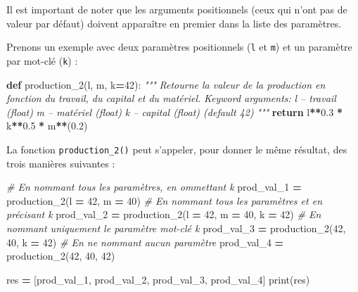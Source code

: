 \documentclass[12pt,]{book}
\newenvironment{Shaded}{\begin{snugshade}}{\end{snugshade}}
\newcommand{\KeywordTok}[1]{\textcolor[rgb]{0.13,0.29,0.53}{\textbf{#1}}}
\newcommand{\DecValTok}[1]{\textcolor[rgb]{0.00,0.00,0.81}{#1}}
\newcommand{\FloatTok}[1]{\textcolor[rgb]{0.00,0.00,0.81}{#1}}
\newcommand{\CommentTok}[1]{\textcolor[rgb]{0.56,0.35,0.01}{\textit{#1}}}
\newcommand{\ControlFlowTok}[1]{\textcolor[rgb]{0.13,0.29,0.53}{\textbf{#1}}}
\newcommand{\OperatorTok}[1]{\textcolor[rgb]{0.81,0.36,0.00}{\textbf{#1}}}
\newcommand{\BuiltInTok}[1]{#1}
\newcommand{\NormalTok}[1]{#1}
\numberwithin{equation}{section}
\numberwithin{countremarque}{section}
\begin{document}
Il est important de noter que les arguments positionnels (ceux qui n'ont
pas de valeur par défaut) doivent apparaître en premier dans la liste
des paramètres.

Prenons un exemple avec deux paramètres positionnels (\texttt{l} et
\texttt{m}) et un paramètre par mot-clé (\texttt{k}) :

\begin{Shaded}
\begin{Highlighting}[]
\KeywordTok{def}\NormalTok{ production_2(l, m, k}\OperatorTok{=}\DecValTok{42}\NormalTok{):}
  \CommentTok{"""}
\CommentTok{  Retourne la valeur de la production en fonction}
\CommentTok{  du travail, du capital et du matériel.}
\CommentTok{  }
\CommentTok{  Keyword arguments:}
\CommentTok{  l -- travail (float)}
\CommentTok{  m -- matériel (float)}
\CommentTok{  k -- capital (float) (default 42)}
\CommentTok{  """}
  \ControlFlowTok{return}\NormalTok{ l}\OperatorTok{**}\FloatTok{0.3} \OperatorTok{*}\NormalTok{ k}\OperatorTok{**}\FloatTok{0.5} \OperatorTok{*}\NormalTok{ m}\OperatorTok{**}\NormalTok{(}\FloatTok{0.2}\NormalTok{)}
\end{Highlighting}
\end{Shaded}

La fonction \texttt{production\_2()} peut s'appeler, pour donner le même
résultat, des trois manières suivantes :

\begin{Shaded}
\begin{Highlighting}[]
\CommentTok{# En nommant tous les paramètres, en ommettant k}
\NormalTok{prod_val_1 }\OperatorTok{=}\NormalTok{ production_2(l }\OperatorTok{=} \DecValTok{42}\NormalTok{, m }\OperatorTok{=} \DecValTok{40}\NormalTok{)}
\CommentTok{# En nommant tous les paramètres et en précisant k}
\NormalTok{prod_val_2 }\OperatorTok{=}\NormalTok{ production_2(l }\OperatorTok{=} \DecValTok{42}\NormalTok{, m }\OperatorTok{=} \DecValTok{40}\NormalTok{, k }\OperatorTok{=} \DecValTok{42}\NormalTok{)}
\CommentTok{# En nommant uniquement le paramètre mot-clé k}
\NormalTok{prod_val_3 }\OperatorTok{=}\NormalTok{ production_2(}\DecValTok{42}\NormalTok{, }\DecValTok{40}\NormalTok{, k }\OperatorTok{=} \DecValTok{42}\NormalTok{)}
\CommentTok{# En ne nommant aucun paramètre}
\NormalTok{prod_val_4 }\OperatorTok{=}\NormalTok{ production_2(}\DecValTok{42}\NormalTok{, }\DecValTok{40}\NormalTok{, }\DecValTok{42}\NormalTok{)}

\NormalTok{res }\OperatorTok{=}\NormalTok{ [prod_val_1, prod_val_2, prod_val_3, prod_val_4]}
\BuiltInTok{print}\NormalTok{(res)}
\end{Highlighting}
\end{Shaded}
\end{document}
